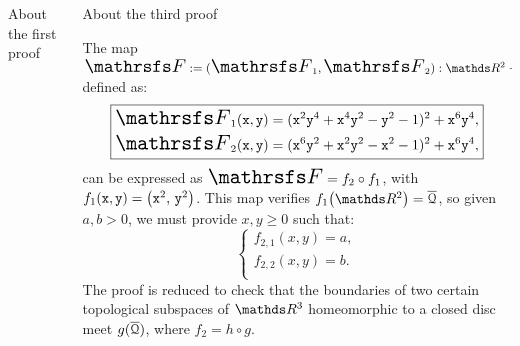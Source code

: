 \documentclass[final]{beamer}
\newlength{\onecolwid}
\newlength{\twocolwid}
\begin{document}
\begin{frame}[t]
\begin{columns}[t]
\begin{column}{\twocolwid}
\begin{columns}[t,totalwidth=\twocolwid]
\begin{column}{\onecolwid}
\begin{block}{About the first proof}
\end{block}
 
 
\end{column} %

\begin{column}{\onecolwid}\vspace{-.6in} %

\vspace{-1cm}
 
\begin{block}{About the third proof}
 
 The map ${\scalebox{1.5}{$\FFF$}}:= ({\scalebox{1.5}{$\FFF$}}_1, {\scalebox{1.5}{$\FFF$}}_2):\R^2\to\R^2$ defined as:
\begin{equation*}\label{eq:thirdMap}
\boxed{
\begin{aligned}
{\scalebox{1.5}{$\FFF$}}_1({\tt x}, {\tt y}) = ({\tt x}^2{\tt y}^4+{\tt x}^4{\tt y}^2-{\tt y}^2-1)^2+{\tt x}^6{\tt y}^4,\\
{\scalebox{1.5}{$\FFF$}}_2(\x, \y) = ({\tt x}^6{\tt y}^2+{\tt x}^2{\tt y}^2-{\tt x}^2-1)^2+{\tt x}^6{\tt y}^4,
\end{aligned}
}
\end{equation*}
can be expressed as ${\scalebox{1.5}{$\FFF$}} = f_2 \circ f_1$, with
$f_1({\tt x},{\tt y})=\big({\tt x}^2,\,{\tt y}^2\big)$.
This map verifies $f_1\big(\R^2\big)=\overline{\Qu}$,
so given $a,b>0$, we must provide $x,y\ge0$ such that:
\begin{equation*}
\left\{
\begin{aligned}
f_{2,1}(x,y)=a,\\
f_{2,2}(x,y)=b.\\
\end{aligned}
\right.
\end{equation*}
The proof is reduced to check that the boundaries of two certain topological subspaces of $\R^3$ homeomorphic to a closed disc meet $g(\overline{\mathcal{Q}})$, where $f_2=h\circ g$.

\end{block}
 
 

\end{column}
\end{columns}
\end{column}
\end{columns}
\end{frame}
\end{document}
